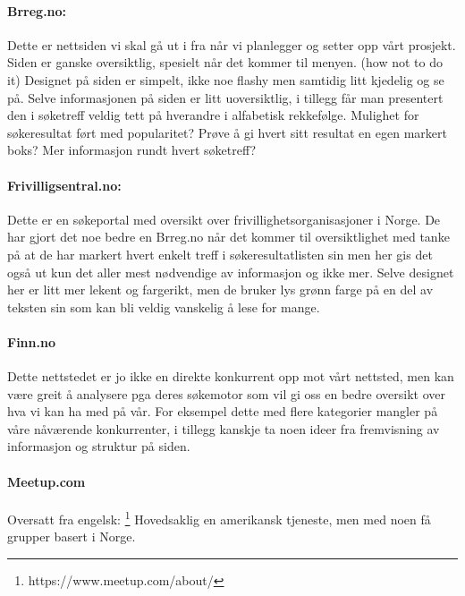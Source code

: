 \paragraph{Brreg.no:}
Dette er nettsiden vi skal gå ut i fra når vi planlegger og setter opp vårt prosjekt.
Siden er ganske oversiktlig, spesielt når det kommer til menyen. (how not to do it)
Designet på siden er simpelt, ikke noe flashy men samtidig litt kjedelig og se på.
Selve informasjonen på siden er litt uoversiktlig, i tillegg får man presentert den i søketreff veldig tett på hverandre i alfabetisk rekkefølge. Mulighet for søkeresultat ført med popularitet?
Prøve å gi hvert sitt resultat en egen markert boks? Mer informasjon rundt hvert søketreff?     

\paragraph{Frivilligsentral.no:}
Dette er en søkeportal med oversikt over frivillighetsorganisasjoner i Norge. De har gjort det noe bedre en Brreg.no når det kommer til oversiktlighet med tanke på at de har markert hvert enkelt treff i søkeresultatlisten sin men her gis det også ut kun det aller mest nødvendige av informasjon og ikke mer. Selve designet her er litt mer lekent og fargerikt, men de bruker lys grønn farge på en del av teksten sin som kan bli veldig vanskelig å lese for mange.

\paragraph{Finn.no}
Dette nettstedet er jo ikke en direkte konkurrent opp mot vårt nettsted, men kan være greit å analysere pga deres søkemotor som vil gi oss en bedre oversikt over hva vi kan ha med på vår. For eksempel dette med flere kategorier mangler på våre nåværende konkurrenter, i tillegg kanskje ta noen ideer fra fremvisning av informasjon og struktur på siden.

\paragraph{Meetup.com}
Oversatt fra engelsk:
  \footnote{https://www.meetup.com/about/} Hovedsaklig en amerikansk tjeneste, men med noen få grupper basert i Norge.


